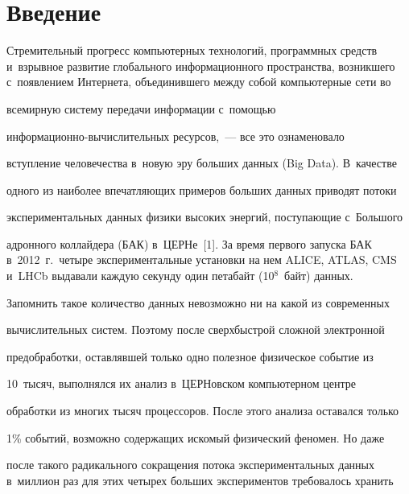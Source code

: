 







      \thispagestyle{headings}





\section{Введение}





\vspace*{-2pt}





  Стремительный прогресс компьютерных технологий, программных средств и~взрывное развитие глобального информационного пространства, возникшего с~появлением Интернета, объединившего между собой компьютерные сети во


всемирную систему передачи информации с~помощью


  ин\-фор\-ма\-ци\-он\-но-вы\-чис\-ли\-тель\-ных ресурсов,~--- все это ознаменовало


вступление человечества в~новую эру больших данных (Big Data). В~качестве


одного из наиболее впечатляющих примеров больших данных приводят потоки


экспериментальных данных физики высоких энергий, поступающие с~Большого


адронного коллайдера (БАК) в~ЦЕРНе~[1]. За время первого запуска БАК в~2012~г.\ четыре экспериментальные установки на нем ALICE, ATLAS, CMS и~LHCb выдавали каждую секунду один петабайт (10$^8$~байт) данных.


Запомнить такое количество данных невозможно ни на какой из современных


вычислительных систем. Поэтому после сверхбыстрой сложной электронной


предобработки, оставлявшей только одно полезное физическое событие из


10~тысяч, выполнялся их анализ в~ЦЕРНовском компьютерном центре


обработки из многих тысяч процессоров. После этого анализа оставался только


1\% событий, возможно содержащих искомый физический феномен. Но даже


после такого радикального сокращения потока экспериментальных данных в~миллион раз для этих четырех больших экспериментов требовалось хранить


